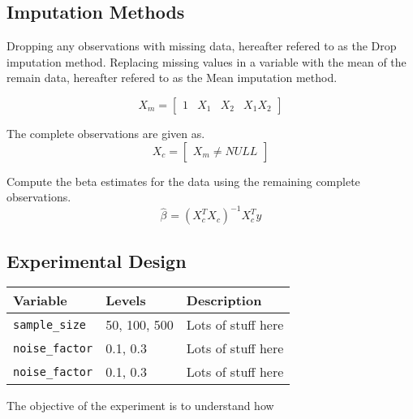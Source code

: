 \documentclass[../paper.tex]{subfiles}
\begin{document}
\subsection{Imputation Methods}
Dropping any observations with missing data, hereafter refered to as the Drop imputation method.
Replacing missing values in a variable with the mean of the remain data,
hereafter refered to as the Mean imputation method.

\begin{equation}
X_{m} = \begin{bmatrix} \label{eq:lol}
  1 & X_{1} & X_{2} & X_{1}X_{2}
\end{bmatrix}
\end{equation}

The complete observations are given as.
\begin{equation}
X_{c} = \begin{bmatrix} \label{eq:lol}
  X_{m} \neq NULL
\end{bmatrix}
\end{equation}

Compute the beta estimates for the data using the remaining complete observations.
\begin{equation}
\hat{\beta}_{} = (X_{c}^{T}X_{c})^{-1} X_{c}^{T} y
\end{equation}




\subsection{Experimental Design}

\begin{center}
    \begin{tabular}{ | l | p{1.5in} | p{3in} | }
    \hline
    Variable & Levels & Description \\ \hline
    \texttt{sample_size} & 50, 100, 500 &  Lots of stuff here \\ \hline
    \texttt{noise_factor} & 0.1, 0.3 &  Lots of stuff here \\ \hline
    \texttt{noise_factor} & 0.1, 0.3 &  Lots of stuff here \\ \hline
    \end{tabular}
\end{center}

The objective of the experiment is to understand how
\end{document}
